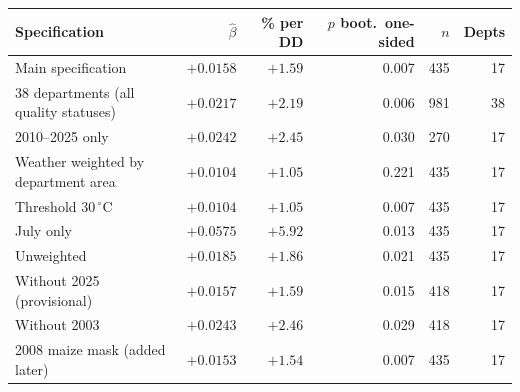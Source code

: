 \begin{tabular}{lrrrrr}
\toprule
Specification & $\hat\beta$ & \% per DD & $p$ boot.\ one-sided & $n$ & Depts \\
\midrule
Main specification & $+0.0158$ & $+1.59$ & 0.007 & 435 & 17 \\
38 departments (all quality statuses) & $+0.0217$ & $+2.19$ & 0.006 & 981 & 38 \\
2010--2025 only & $+0.0242$ & $+2.45$ & 0.030 & 270 & 17 \\
Weather weighted by department area & $+0.0104$ & $+1.05$ & 0.221 & 435 & 17 \\
Threshold 30\,$^{\circ}$C & $+0.0104$ & $+1.05$ & 0.007 & 435 & 17 \\
July only & $+0.0575$ & $+5.92$ & 0.013 & 435 & 17 \\
Unweighted & $+0.0185$ & $+1.86$ & 0.021 & 435 & 17 \\
Without 2025 (provisional) & $+0.0157$ & $+1.59$ & 0.015 & 418 & 17 \\
Without 2003 & $+0.0243$ & $+2.46$ & 0.029 & 418 & 17 \\
2008 maize mask (added later) & $+0.0153$ & $+1.54$ & 0.007 & 435 & 17 \\
\bottomrule
\end{tabular}

